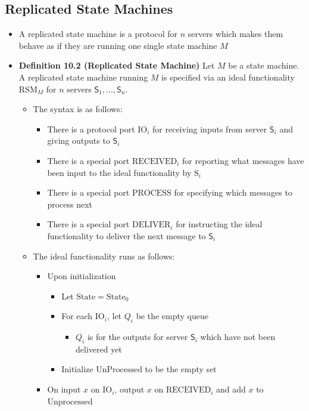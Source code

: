 \documentclass[11pt]{article}
\begin{document}
\subsection{Replicated State Machines}
\label{sec:orgf357e0b}
\begin{itemize}
\item A replicated state machine is a protocol for \(n\) servers which makes them behave as if they are running one single state machine \(M\)

\item \textbf{Definition 10.2 (Replicated State Machine)} Let \(M\) be a state machine. A replicated state machine running \(M\) is specified via an ideal functionality \(\text{RSM}_M\) for \(n\) servers \(\mathsf{S}_1, \dots, \mathsf{S}_n\).
\begin{itemize}
\item The syntax is as follows:
\begin{itemize}
\item There is a protocol port \(\text{IO}_i\) for receiving inputs from server \(\mathsf{S}_i\) and giving outputs to \(\mathsf{S}_i\)
\item There is a special port \(\text{RECEIVED}_i\) for reporting what messages have been input to the ideal functionality by \(\text{S}_i\)
\item There is a special port \(\text{PROCESS}\) for specifying which messages to process next
\item There is a special port \(\text{DELIVER}_i\) for instructing the ideal functionality to deliver the next message to \(\mathsf{S}_i\)
\end{itemize}
\item The ideal functionality runs as follows:
\begin{itemize}
\item Upon initialization
\begin{itemize}
\item Let \(\text{State}=\text{State}_0\)
\item For each \(\text{IO}_i\), let \(Q_i\) be the empty queue
\begin{itemize}
\item \(Q_i\) is for the outputs for server \(\mathsf S_i\) which have not been delivered yet
\end{itemize}
\item Initialize \(\text{UnProcessed}\) to be the empty set
\end{itemize}
\item On input \(x\) on \(\text{IO}_i\), output \(x\) on \(\text{RECEIVED}_i\) and add \(x\) to \(\text{Unprocessed}\)

\end{itemize}
\end{itemize}
\end{itemize}
\end{document}

